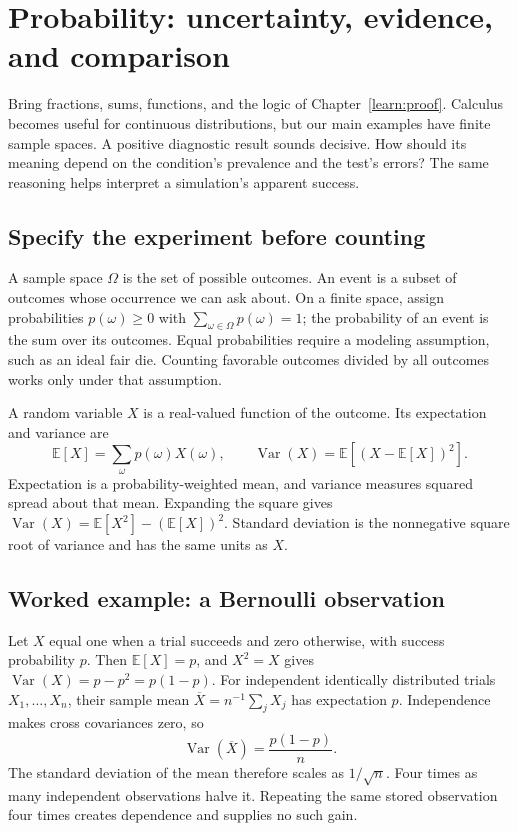 \chapter{Probability: uncertainty, evidence, and comparison}
\label{learn:probability}



Bring fractions, sums, functions, and the logic of Chapter~\ref{learn:proof}.
Calculus becomes useful for continuous distributions, but our main examples
have finite sample spaces. A positive diagnostic result sounds decisive.
How should its meaning depend on the condition's prevalence and the test's
errors? The same reasoning helps interpret a simulation's apparent success.



\section{Specify the experiment before counting}
A sample space $\Omega$ is the set of possible outcomes. An event is a
subset of outcomes whose occurrence we can ask about. On a finite space,
assign probabilities $p(\omega)\geq0$ with
$\sum_{\omega\in\Omega}p(\omega)=1$; the probability of an event is the
sum over its outcomes. Equal probabilities require a modeling assumption,
such as an ideal fair die. Counting favorable outcomes divided by all outcomes
works only under that assumption.

A random variable $X$ is a real-valued function of the outcome. Its expectation
and variance are
\[
 \mathbb E[X]=\sum_{\omega}p(\omega)X(\omega),\qquad
 \operatorname{Var}(X)=\mathbb E[(X-\mathbb E[X])^2].
\]
Expectation is a probability-weighted mean, and variance measures squared
spread about that mean. Expanding the square gives
$\operatorname{Var}(X)=\mathbb E[X^2]-(\mathbb E[X])^2$.
Standard deviation is the nonnegative square root of variance and has the
same units as $X$.

\section{Worked example: a Bernoulli observation}
Let $X$ equal one when a trial succeeds and zero otherwise, with success
probability $p$. Then $\mathbb E[X]=p$, and $X^2=X$ gives
$\operatorname{Var}(X)=p-p^2=p(1-p)$. For independent identically
distributed trials $X_1,\ldots,X_n$, their sample mean
$\overline X=n^{-1}\sum_jX_j$ has expectation $p$. Independence makes
cross covariances zero, so
\[
 \operatorname{Var}(\overline X)=\frac{p(1-p)}n.
\]
The standard deviation of the mean therefore scales as $1/\sqrt n$.
Four times as many independent observations halve it. Repeating the same
stored observation four times creates dependence and supplies no such gain.

